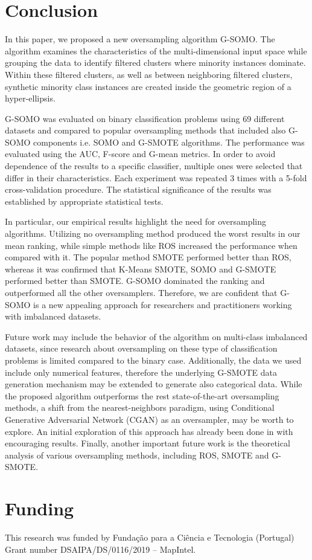 \documentclass[parskip=full]{scrartcl}
\begin{document}
\section{Conclusion}

In this paper, we proposed a new oversampling algorithm G-SOMO. The algorithm examines the characteristics of the multi-dimensional input space while grouping the data to identify filtered clusters where minority instances dominate. Within these filtered clusters, as well as between neighboring filtered clusters, synthetic minority class instances are created inside the geometric region of a hyper-ellipsis.

G-SOMO was evaluated on binary classification problems using 69 different datasets and compared to popular oversampling methods that included also G-SOMO components i.e. SOMO and G-SMOTE algorithms. The performance was evaluated using the AUC, F-score and G-mean metrics. In order to avoid dependence of the results to a specific classifier, multiple ones were selected that differ in their characteristics. Each experiment was repeated 3 times with a 5-fold cross-validation procedure. The statistical significance of the results was established by appropriate statistical tests.

In particular, our empirical results highlight the need for oversampling algorithms. Utilizing no oversampling method produced the worst results in our mean ranking, while simple methods like ROS increased the performance when compared with it. The popular method SMOTE performed better than ROS, whereas it was confirmed that K-Means SMOTE, SOMO and G-SMOTE performed better than SMOTE. G-SOMO dominated the ranking and outperformed all the other oversamplers. Therefore, we are confident that G-SOMO is a new appealing approach for researchers and practitioners working with imbalanced datasets.

Future work may include the behavior of the algorithm on multi-class imbalanced datasets, since research about oversampling on these type of classification problems is limited compared to the binary case. Additionally, the data we used include only numerical features, therefore the underlying G-SMOTE data generation mechanism may be extended to generate also categorical data. While the proposed algorithm outperforms the rest state-of-the-art oversampling methods, a shift from the nearest-neighbors paradigm, using Conditional Generative Adversarial Network (CGAN) as an oversampler, may be worth to explore. An initial exploration of this approach has already been done in \cite{Douzas2018b} with encouraging results. Finally, another important future work is the theoretical analysis of various oversampling methods, including ROS, SMOTE and G-SMOTE.

\section*{Funding}

This research was funded by Fundação para a Ciência e Tecnologia (Portugal) \\
Grant number DSAIPA/DS/0116/2019 – MapIntel.



\end{document}
